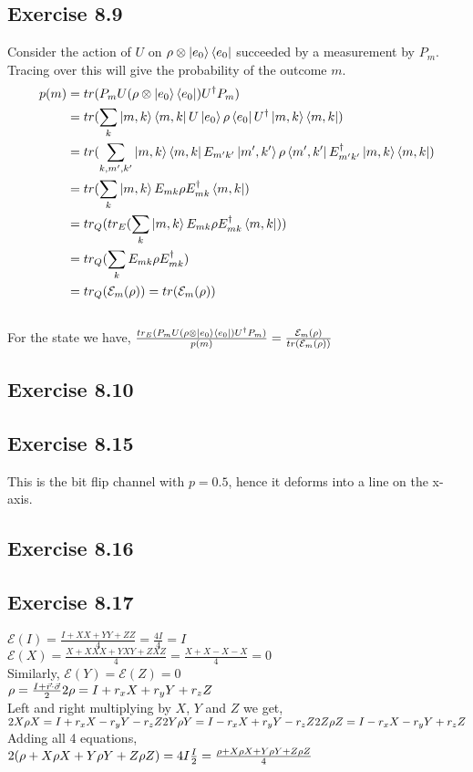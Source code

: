 \documentclass[a4paper,12pt]{article}
\begin{document}
\subsection*{Exercise 8.9}
Consider the action of $U$ on $\rho\otimes \ket{e_0}\bra{e_0}$ succeeded by a measurement by $P_m$.
Tracing over this will give the probability of the outcome $m$.\\
\begin{align*}
    p(m)&=tr(P_m U(\rho\otimes \ket{e_0}\bra{e_0})U^\dagger P_m)\\
&=tr(\displaystyle \sum_k \ket{m,k}\bra{m,k}U\ket{e_0}\rho\bra{e_0}U^\dagger \ket{m,k}\bra{m,k})\\
&=tr(\displaystyle \sum_{k,m^\prime,k^\prime} \ket{m,k}\bra{m,k}E_{m^\prime k^\prime}\ket{m^\prime, k^\prime}
\rho\bra{m^\prime, k^\prime}E_{m^\prime k^\prime}^\dagger \ket{m,k}\bra{m,k})\\
&=tr(\displaystyle \sum_{k} \ket{m,k}E_{m k}
\rho E_{mk}^\dagger\bra{m,k})\\
&=tr_Q(tr_E(\displaystyle \sum_{k} \ket{m,k}E_{mk}
\rho E_{mk}^\dagger\bra{m,k}))\\
&=tr_Q(\displaystyle \sum_{k} E_{mk}
\rho E_{mk}^\dagger)\\
&=tr_Q(\mathcal{E}_m(\rho))=tr(\mathcal{E}_m(\rho))
\end{align*}\\

For the state we have,
$\frac{tr_E(P_m U(\rho\otimes \ket{e_0}\bra{e_0})U^\dagger P_m)}{p(m)}=\frac{\mathcal{E}_m(\rho)}{tr(\mathcal{E}_m(\rho))}$
\subsection*{Exercise 8.10}
\subsection*{Exercise 8.15}
This is the bit flip channel with $p=0.5$, hence it deforms into a line on the x-axis.
\subsection*{Exercise 8.16}
\subsection*{Exercise 8.17}
$\mathcal{E}(I)=\frac{I+XX+YY+ZZ}{4}=\frac{4I}{4}=I$\\
$\mathcal{E}(X)=\frac{X+XXX+YXY+ZXZ}{4}=\frac{X+X-X-X}{4}=0$\\
Similarly, $\mathcal{E}(Y)=\mathcal{E}(Z)=0$\\
$\rho=\frac{I+\vec{r}\cdot\vec{\sigma}}{2}\\
2\rho=I+r_xX+r_yY+r_zZ$\\
Left and right multiplying by $X$, $Y$ and $Z$ we get,\\
$2X\rho X=I+r_xX-r_yY-r_zZ\\
2Y\rho Y=I-r_xX+r_yY-r_zZ\\
2Z\rho Z=I-r_xX-r_yY+r_zZ$\\
Adding all 4 equations,\\
$2(\rho+X\rho X+Y\rho Y+Z\rho Z)=4I\\
\frac{I}{2}=\frac{\rho+X\rho X+Y\rho Y+Z\rho Z}{4}$
\end{document}
